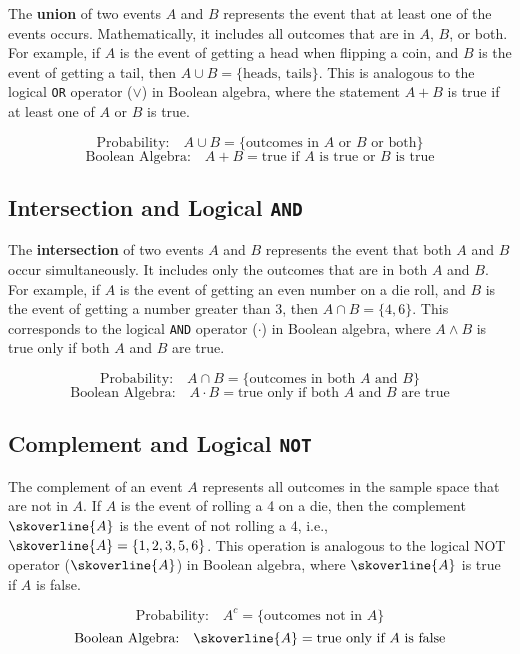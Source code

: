The \textbf{union} of two events \( A \) and \( B \) represents the event that at least one of the events occurs. Mathematically, it includes all outcomes that are in \( A \), \( B \), or both. For example, if \( A \) is the event of getting a head when flipping a coin, and \( B \) is the event of getting a tail, then \( A \cup B = \{\text{heads, tails}\} \). This is analogous to the logical \texttt{OR} operator (\(\lor\)) in Boolean algebra, where the statement \( A + B \) is true if at least one of \( A \) or \( B \) is true.

\[
\text{Probability:} \quad A \cup B = \{\text{outcomes in } A \text{ or } B \text{ or both}\}
\]
\[
\text{Boolean Algebra:} \quad A + B = \text{true if } A \text{ is true or } B \text{ is true}
\]


\subsection*{Intersection and Logical \texttt{AND}}

The \textbf{intersection} of two events \( A \) and \( B \) represents the event that both \( A \) and \( B \) occur simultaneously. It includes only the outcomes that are in both \( A \) and \( B \). For example, if \( A \) is the event of getting an even number on a die roll, and \( B \) is the event of getting a number greater than 3, then \( A \cap B = \{4, 6\} \). This corresponds to the logical \texttt{AND} operator (\(\cdot\)) in Boolean algebra, where \( A \land B \) is true only if both \( A \) and \( B \) are true.

\[
\text{Probability:} \quad A \cap B = \{\text{outcomes in both } A \text{ and } B\}
\]
\[
\text{Boolean Algebra:} \quad A \cdot B = \text{true only if both } A \text{ and } B \text{ are true}
\]

\subsection*{Complement and Logical \texttt{NOT}}

The complement of an event \( A \) represents all outcomes in the sample space that are not in \( A \). If \( A \) is the event of rolling a 4 on a die, then the complement \( \skoverline{A} \) is the event of not rolling a 4, i.e., \( \skoverline{A} = \{1, 2, 3, 5, 6\} \). This operation is analogous to the logical NOT operator (\(\skoverline{A}\)) in Boolean algebra, where \(\skoverline{A}\) is true if \( A \) is false.

\[
\text{Probability:} \quad A^c = \{\text{outcomes not in } A\}
\]
\[
\text{Boolean Algebra:} \quad \skoverline{A} = \text{true only if } A \text{ is false}
\]

